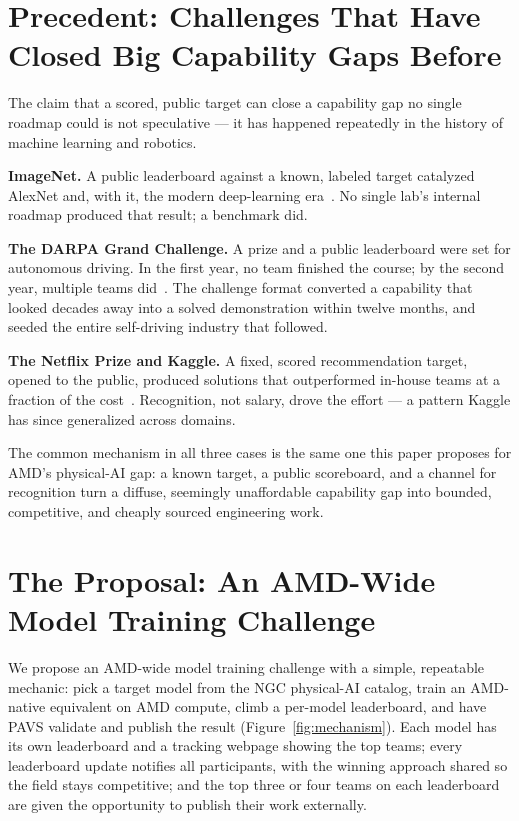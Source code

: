 \documentclass[blind]{gtac}
\begin{document}
\section{Precedent: Challenges That Have Closed Big Capability Gaps Before}
\label{sec:precedent}

The claim that a scored, public target can close a capability gap no single roadmap could is not speculative --- it has happened repeatedly in the history of machine learning and robotics.

\textbf{ImageNet.} A public leaderboard against a known, labeled target catalyzed AlexNet and, with it, the modern deep-learning era~\cite{imagenet_deng,alexnet_krizhevsky}. No single lab's internal roadmap produced that result; a benchmark did.

\textbf{The DARPA Grand Challenge.} A prize and a public leaderboard were set for autonomous driving. In the first year, no team finished the course; by the second year, multiple teams did~\cite{darpa_grand_challenge}. The challenge format converted a capability that looked decades away into a solved demonstration within twelve months, and seeded the entire self-driving industry that followed.

\textbf{The Netflix Prize and Kaggle.} A fixed, scored recommendation target, opened to the public, produced solutions that outperformed in-house teams at a fraction of the cost~\cite{netflix_prize}. Recognition, not salary, drove the effort --- a pattern Kaggle has since generalized across domains.

The common mechanism in all three cases is the same one this paper proposes for AMD's physical-AI gap: a known target, a public scoreboard, and a channel for recognition turn a diffuse, seemingly unaffordable capability gap into bounded, competitive, and cheaply sourced engineering work.

\section{The Proposal: An AMD-Wide Model Training Challenge}
\label{sec:proposal}

We propose an AMD-wide model training challenge with a simple, repeatable mechanic: pick a target model from the NGC physical-AI catalog, train an AMD-native equivalent on AMD compute, climb a per-model leaderboard, and have PAVS validate and publish the result (Figure~\ref{fig:mechanism}). Each model has its own leaderboard and a tracking webpage showing the top teams; every leaderboard update notifies all participants, with the winning approach shared so the field stays competitive; and the top three or four teams on each leaderboard are given the opportunity to publish their work externally.
\end{document}
